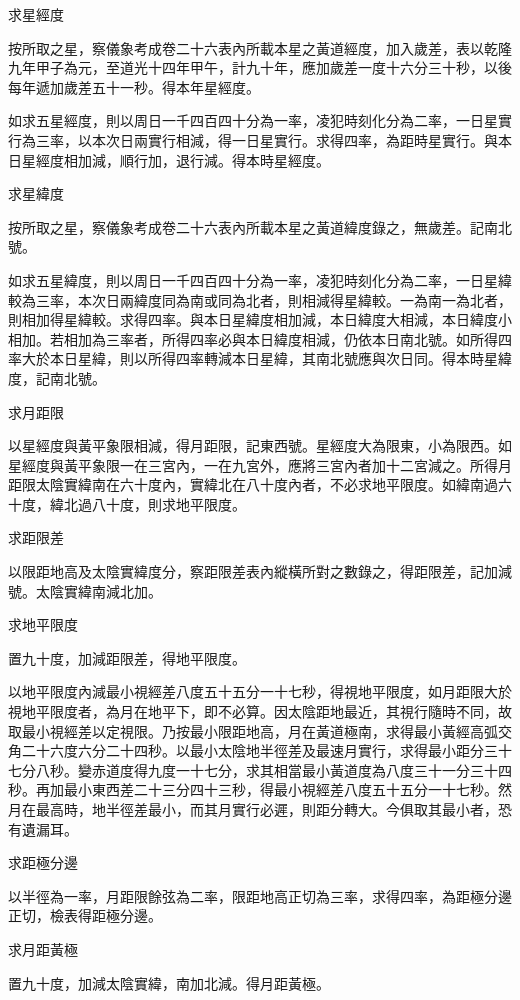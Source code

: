 \begin{pinyinscope}
求星經度

按所取之星，察儀象考成卷二十六表內所載本星之黃道經度，加入歲差，表以乾隆九年甲子為元，至道光十四年甲午，計九十年，應加歲差一度十六分三十秒，以後每年遞加歲差五十一秒。得本年星經度。

如求五星經度，則以周日一千四百四十分為一率，凌犯時刻化分為二率，一日星實行為三率，以本次日兩實行相減，得一日星實行。求得四率，為距時星實行。與本日星經度相加減，順行加，退行減。得本時星經度。

求星緯度

按所取之星，察儀象考成卷二十六表內所載本星之黃道緯度錄之，無歲差。記南北號。

如求五星緯度，則以周日一千四百四十分為一率，凌犯時刻化分為二率，一日星緯較為三率，本次日兩緯度同為南或同為北者，則相減得星緯較。一為南一為北者，則相加得星緯較。求得四率。與本日星緯度相加減，本日緯度大相減，本日緯度小相加。若相加為三率者，所得四率必與本日緯度相減，仍依本日南北號。如所得四率大於本日星緯，則以所得四率轉減本日星緯，其南北號應與次日同。得本時星緯度，記南北號。

求月距限

以星經度與黃平象限相減，得月距限，記東西號。星經度大為限東，小為限西。如星經度與黃平象限一在三宮內，一在九宮外，應將三宮內者加十二宮減之。所得月距限太陰實緯南在六十度內，實緯北在八十度內者，不必求地平限度。如緯南過六十度，緯北過八十度，則求地平限度。

求距限差

以限距地高及太陰實緯度分，察距限差表內縱橫所對之數錄之，得距限差，記加減號。太陰實緯南減北加。

求地平限度

置九十度，加減距限差，得地平限度。

以地平限度內減最小視經差八度五十五分一十七秒，得視地平限度，如月距限大於視地平限度者，為月在地平下，即不必算。因太陰距地最近，其視行隨時不同，故取最小視經差以定視限。乃按最小限距地高，月在黃道極南，求得最小黃經高弧交角二十六度六分二十四秒。以最小太陰地半徑差及最速月實行，求得最小距分三十七分八秒。變赤道度得九度一十七分，求其相當最小黃道度為八度三十一分三十四秒。再加最小東西差二十三分四十三秒，得最小視經差八度五十五分一十七秒。然月在最高時，地半徑差最小，而其月實行必遲，則距分轉大。今俱取其最小者，恐有遺漏耳。

求距極分邊

以半徑為一率，月距限餘弦為二率，限距地高正切為三率，求得四率，為距極分邊正切，檢表得距極分邊。

求月距黃極

置九十度，加減太陰實緯，南加北減。得月距黃極。


\end{pinyinscope}
